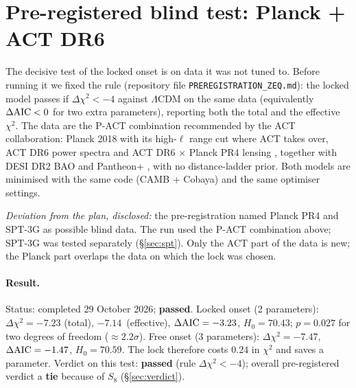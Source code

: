 \documentclass[11pt]{article}
\newcommand{\PACTstatus}{completed 29 October 2026; \textbf{passed}}
\newcommand{\PACTdchiL}{\ensuremath{-7.14}}   %
\newcommand{\PACTdchiE}{\ensuremath{-7.23}}   %
\newcommand{\PACTdaic}{\ensuremath{-3.23}}    %
\newcommand{\PACTfreeL}{\ensuremath{-7.47}}   %
\newcommand{\PACTverdict}{\textbf{passed} (rule $\Delta\chi^2<-4$); overall pre-registered verdict a \textbf{tie} because of $S_8$ (\S\ref{sec:verdict})}
\begin{document}
\section{Pre-registered blind test: Planck + ACT DR6}\label{sec:pact}
The decisive test of the locked onset is on data it was not tuned to. Before running it we
fixed the rule (repository file \texttt{PREREGISTRATION\_ZEQ.md}): the locked model passes if
$\Delta\chi^2<-4$ against $\Lambda$CDM on the same data (equivalently $\Delta{\rm AIC}<0$ for two
extra parameters), reporting both the total and the effective $\chi^2$. The data are the P-ACT
combination recommended by the ACT collaboration: Planck 2018 with its high-$\ell$ range cut
where ACT takes over, ACT DR6 power spectra \cite{louis2025} and ACT DR6 $\times$ Planck PR4 lensing
\cite{madhavacheril2024,qu2024}, together with DESI DR2 BAO \cite{desi2025} and Pantheon+
\cite{scolnic2022,brout2022}, with no distance-ladder prior. Both models are minimised with the same
code (CAMB + Cobaya) and the same optimiser settings.

\emph{Deviation from the plan, disclosed:} the pre-registration named Planck PR4 and SPT-3G as
possible blind data. The run used the P-ACT combination above; SPT-3G was tested separately
(\S\ref{sec:spt}). Only the
ACT part of the data is new; the Planck part overlaps the data on which the lock was chosen.

\paragraph{Result.} Status: \PACTstatus. Locked onset (2 parameters): $\Delta\chi^2=\PACTdchiE$
(total), \PACTdchiL\ (effective), $\Delta{\rm AIC}=\PACTdaic$, $H_0=70.43$; $p=0.027$ for two degrees
of freedom ($\approx2.2\sigma$). Free onset (3 parameters): $\Delta\chi^2=\PACTfreeL$,
$\Delta{\rm AIC}=-1.47$, $H_0=70.59$. The lock therefore costs $0.24$ in $\chi^2$ and saves a
parameter. Verdict on this test: \PACTverdict.
\end{document}
